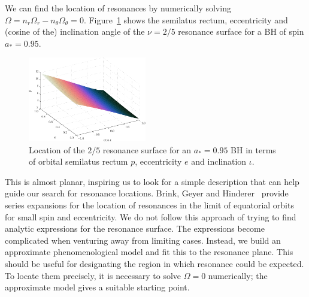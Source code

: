 \documentclass[aps,prd,amsfonts,amssymb,amsmath,nofootinbib,showpacs,superscriptaddress,twocolumn,floatfix]{revtex4-1}
\newcommand{\Figref}[1]{Figure~\ref{fig:#1}}
\begin{document}
We can find the location of resonances by numerically solving $\Omega = n_r \Omega_r - n_\theta \Omega_\theta = 0$. \Figref{res-plane-2-5-95} shows the semilatus rectum, eccentricity and (cosine of the) inclination angle of the $\nu = 2/5$ resonance surface for a BH of spin $a_\ast = 0.95$. 
\begin{figure}
\centering
\includegraphics[width=0.46\textwidth]{Fig_res-2-5-95-plane}
\caption{\label{fig:res-plane-2-5-95}Location of the $2/5$ resonance surface for an $a_\ast = 0.95$ BH in terms of orbital semilatus rectum $p$, eccentricity $e$ and inclination $\iota$.}
\end{figure}
This is almost planar, inspiring us to look for a simple description that can help guide our search for resonance locations. Brink, Geyer and Hinderer~\cite{Brink2013} provide series expansions for the location of resonances in the limit of equatorial orbits for small spin and eccentricity. We do not follow this approach of trying to find analytic expressions for the resonance surface. The expressions become complicated when venturing away from limiting cases. Instead, we build an approximate phenomenological model and fit this to the resonance plane. %
This should be useful for designating the region in which resonance could be expected. To locate them precisely, it is necessary to solve $\Omega = 0$ numerically; the approximate model gives a suitable starting point.
\end{document}
